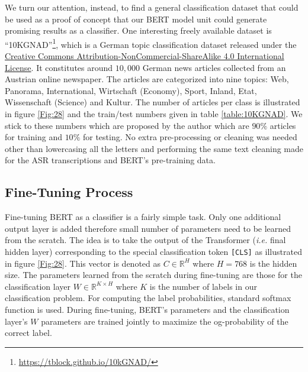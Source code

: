 

We turn our attention, instead, to find a general classification dataset that could be used as a proof of concept that our \ac{BERT} model unit could generate promising results as a classifier. One interesting freely available dataset is \enquote{\ac{10KGNAD}}\footnote{\url{https://tblock.github.io/10kGNAD/}}, which is a German topic classification dataset released under the \href{https://creativecommons.org/licenses/by-nc-sa/4.0/}{Creative Commons Attribution-NonCommercial-ShareAlike 4.0 International License}. It constitutes around $10,000$ German news articles collected from an Austrian online newspaper. The articles are categorized into nine topics: Web, Panorama, International, Wirtschaft (Economy), Sport, Inland, Etat, Wissenschaft (Science) and Kultur. The number of articles per class is illustrated in figure \ref{Fig:28} and the train/test numbers given in table \ref{table:10KGNAD}. We stick to these numbers which are proposed by the author which are $90\%$ articles for training and $10\%$ for testing. No extra pre-processing or cleaning was needed other than lowercasing all the letters and performing the same text cleaning made for the \ac{ASR} transcriptions and \ac{BERT}'s pre-training data.


\subsection{Fine-Tuning Process}
\label{meth:sub4}


Fine-tuning \ac{BERT} as a classifier is a fairly simple task. Only one additional output layer is added therefore small number of parameters need to be learned from the scratch. The idea is to take the output of the Transformer (\textit{i.e.} final hidden layer) corresponding to the special classification token \texttt{[CLS]} as illustrated in figure \ref{Fig:28}. This vector is denoted as $C \in {\mathbb{R}}^{H}$ where $H=768$ is the hidden size. The parameters learned from the scratch during fine-tuning are those for the classification layer $W \in {\mathbb{R}}^{K\times H} $ where $K$ is the number of labels in our classification problem. For computing the label probabilities, standard softmax function is used. During fine-tuning, \ac{BERT}'s parameters and the classification layer's $W$ parameters are trained jointly to maximize the og-probability of the correct label.

